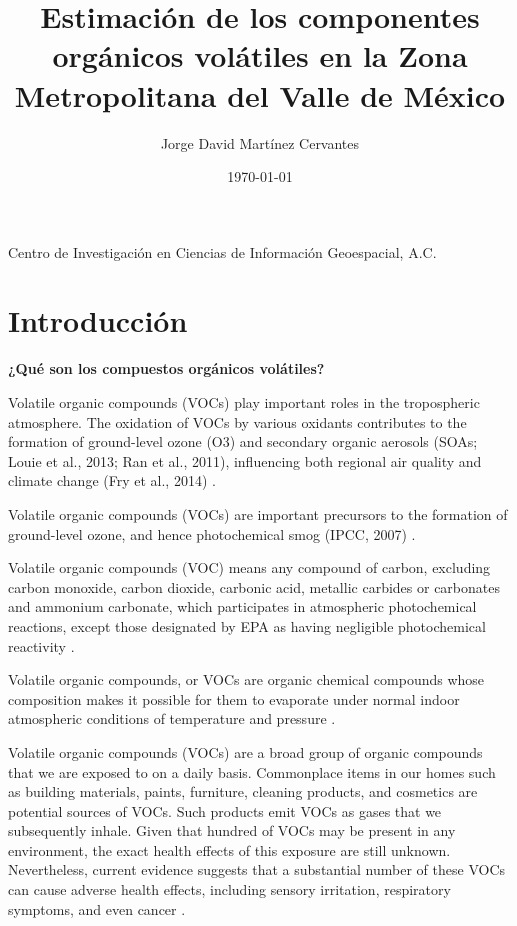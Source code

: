\documentclass[10pt]{article}
\title{\renewcommand{\baselinestretch}{1.17}\bf%
Estimación de los componentes orgánicos volátiles en la Zona Metropolitana del Valle de México
}
\author{%
Jorge David Martínez Cervantes
}
\begin{document}
\date{\today}

\maketitle

\vspace{-0.5cm}

\begin{center}
{\footnotesize 
Centro de Investigación en Ciencias de Información Geoespacial, A.C. \\
}
\end{center}


\section{Introducción}\label{sec:1}

\textbf{¿Qué son los compuestos orgánicos volátiles?}

Volatile organic compounds (VOCs) play important roles in the tropospheric atmosphere. The oxidation of VOCs by various oxidants contributes to the formation of ground-level ozone (O3) and secondary organic aerosols (SOAs; Louie et al., 2013; Ran et al., 2011), influencing both regional air quality and climate change (Fry et al., 2014) \cite{Wu2020}.

Volatile organic compounds (VOCs) are important precursors to the formation of ground-level ozone, and hence photochemical smog (IPCC, 2007) \cite{Louie2013}.

Volatile organic compounds (VOC) means any compound of carbon, excluding carbon monoxide, carbon dioxide, carbonic acid, metallic carbides or carbonates and ammonium carbonate, which participates in atmospheric photochemical reactions, except those designated by EPA as having negligible photochemical reactivity \cite{EPA2017}.

Volatile organic compounds, or VOCs are organic chemical compounds whose composition makes it possible for them to evaporate under normal indoor atmospheric conditions of temperature and pressure \cite{EPA2017}.

Volatile organic compounds (VOCs) are a broad group of organic compounds that we are exposed to on a daily basis. Commonplace items in our homes such as building materials, paints, furniture, cleaning products, and cosmetics are potential sources of VOCs. Such products emit VOCs as gases that we subsequently inhale. Given that hundred of VOCs may be present in any environment, the exact health effects of this exposure are still unknown. Nevertheless, current evidence suggests that a substantial number of these VOCs can cause adverse health effects, including sensory irritation, respiratory symptoms, and even cancer \cite{Rumchev2007}.
\end{document}
